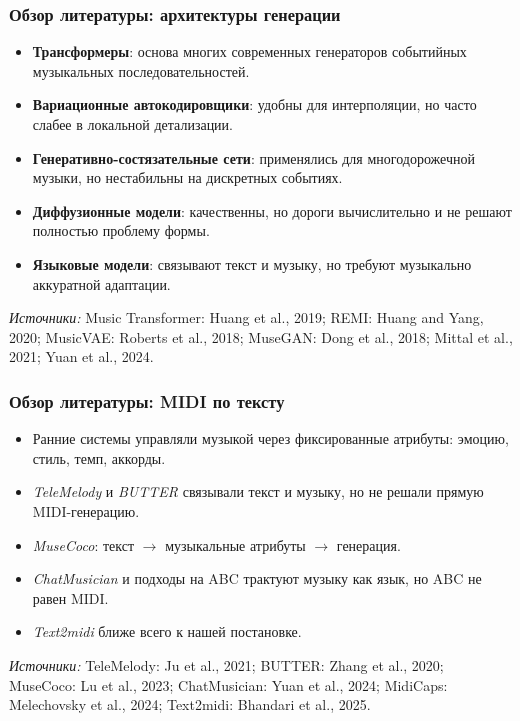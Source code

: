 \documentclass[aspectratio=169]{beamer}
\newcommand{\litrefs}[1]{\vfill{\scriptsize\textit{Источники:} #1}}
\begin{document}
\begin{frame}
\frametitle{Обзор литературы: архитектуры генерации}
\small
\begin{itemize}
    \item \textbf{Трансформеры}: основа многих современных генераторов событийных музыкальных последовательностей.
    \item \textbf{Вариационные автокодировщики}: удобны для интерполяции, но часто слабее в локальной детализации.
    \item \textbf{Генеративно-состязательные сети}: применялись для многодорожечной музыки, но нестабильны на дискретных событиях.
    \item \textbf{Диффузионные модели}: качественны, но дороги вычислительно и не решают полностью проблему формы.
    \item \textbf{Языковые модели}: связывают текст и музыку, но требуют музыкально аккуратной адаптации.
\end{itemize}

\litrefs{Music Transformer: Huang et al., 2019; REMI: Huang and Yang, 2020; MusicVAE: Roberts et al., 2018; MuseGAN: Dong et al., 2018; Mittal et al., 2021; Yuan et al., 2024.}
\end{frame}

\begin{frame}
\frametitle{Обзор литературы: MIDI по тексту}
\begin{itemize}
    \item Ранние системы управляли музыкой через фиксированные атрибуты: эмоцию, стиль, темп, аккорды.
    \item \textit{TeleMelody} и \textit{BUTTER} связывали текст и музыку, но не решали прямую MIDI-генерацию.
    \item \textit{MuseCoco}: текст $\rightarrow$ музыкальные атрибуты $\rightarrow$ генерация.
    \item \textit{ChatMusician} и подходы на ABC трактуют музыку как язык, но ABC не равен MIDI.
    \item \textit{Text2midi} ближе всего к нашей постановке.
\end{itemize}

\litrefs{TeleMelody: Ju et al., 2021; BUTTER: Zhang et al., 2020; MuseCoco: Lu et al., 2023; ChatMusician: Yuan et al., 2024; MidiCaps: Melechovsky et al., 2024; Text2midi: Bhandari et al., 2025.}
\end{frame}
\end{document}
